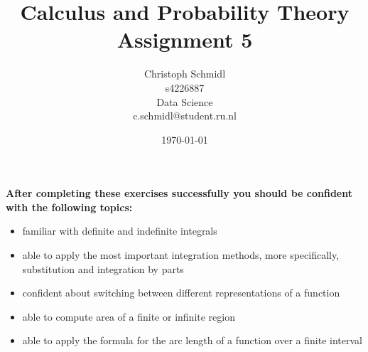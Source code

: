 \documentclass[a4paper]{article}
\title{Calculus and Probability Theory\\ Assignment 5}
\author{Christoph Schmidl\\
s4226887\\
Data Science\\
c.schmidl@student.ru.nl\\}
\date{\today}
\begin{document}
\maketitle





\textbf{After completing these exercises successfully you should be confident with the following topics:}

\begin{itemize}
	\item familiar with definite and indefinite integrals
	\item able to apply the most important integration methods, more specifically, substitution and integration by parts
	\item confident about switching between different representations of a function
	\item able to compute area of a finite or infinite region
	\item able to apply the formula for the arc length of a function over a finite interval
\end{itemize}
\vspace{1em}
\end{document}
